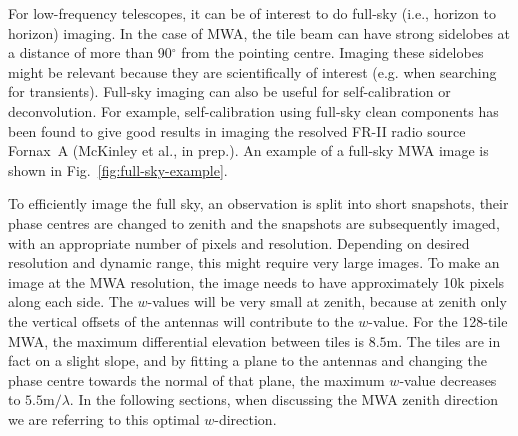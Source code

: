 \documentclass[useAMS,usenatbib]{mn2e}
\newcommand{\degree}{\ensuremath{^{\circ}}\xspace}
\begin{document}
For low-frequency telescopes, it can be of interest to do full-sky (i.e., horizon to horizon) imaging. In the case of MWA, the tile beam can have strong sidelobes at a distance of more than 90\degree from the pointing centre. Imaging these sidelobes might be relevant because they are scientifically of interest (e.g. when searching for transients). Full-sky imaging can also be useful for self-calibration or deconvolution. For example, self-calibration using full-sky clean components has been found to give good results in imaging the resolved FR-II radio source Fornax~A (McKinley et al., in prep.). An example of a full-sky MWA image is shown in Fig.~\ref{fig:full-sky-example}.

To efficiently image the full sky, an observation is split into short snapshots, their phase centres are changed to zenith and the snapshots are subsequently imaged, with an appropriate number of pixels and resolution. Depending on desired resolution and dynamic range, this might require very large images. To make an image at the MWA resolution, the image needs to have approximately 10k pixels along each side. The $w$-values will be very small at zenith, because at zenith only the vertical offsets of the antennas will contribute to the $w$-value. For the 128-tile MWA, the maximum differential elevation between tiles is $8.5$m. The tiles are in fact on a slight slope, and by fitting a plane to the antennas and changing the phase centre towards the normal of that plane, the maximum $w$-value decreases to $5.5\textrm{m} / \lambda$. In the following sections, when discussing the MWA zenith direction we are referring to this optimal $w$-direction.
\end{document}
